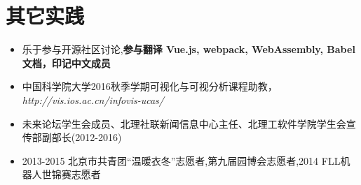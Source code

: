 \documentclass{resume}
\begin{document}
\section{其它实践}
\begin{itemize}[parsep=0.2ex]
  \item 乐于参与开源社区讨论,\textbf{参与翻译 Vue.js, webpack, WebAssembly, Babel 文档，印记中文成员}
  \item 中国科学院大学2016秋季学期可视化与可视分析课程助教，\textit{http://vis.ios.ac.cn/infovis-ucas/}
  \item 未来论坛学生会成员、北理社联新闻信息中心主任、北理工软件学院学生会宣传部副部长(2012-2016)
  \item 2013-2015 北京市共青团“温暖衣冬”志愿者,第九届园博会志愿者,2014 FLL机器人世锦赛志愿者
\end{itemize}

%
%
\end{document}
